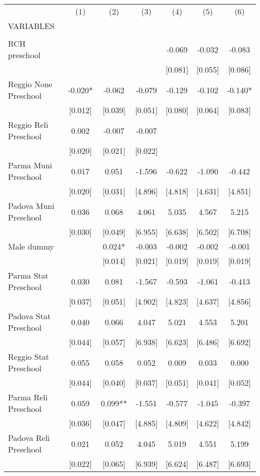 \begin{tabular}{lcccccc} \hline
 & (1) & (2) & (3) & (4) & (5) & (6) \\
VARIABLES &  &  &  &  &  &  \\ \hline
 &  &  &  &  &  &  \\
RCH preschool &  &  &  & -0.069 & -0.032 & -0.083 \\
 &  &  &  & [0.081] & [0.055] & [0.086] \\
Reggio None Preschool & -0.020* & -0.062 & -0.079 & -0.129 & -0.102 & -0.140* \\
 & [0.012] & [0.039] & [0.051] & [0.080] & [0.064] & [0.083] \\
Reggio Reli Preschool & 0.002 & -0.007 & -0.007 &  &  &  \\
 & [0.020] & [0.021] & [0.022] &  &  &  \\
Parma Muni Preschool & 0.017 & 0.051 & -1.596 & -0.622 & -1.090 & -0.442 \\
 & [0.020] & [0.031] & [4.896] & [4.818] & [4.631] & [4.851] \\
Padova Muni Preschool & 0.036 & 0.068 & 4.061 & 5.035 & 4.567 & 5.215 \\
 & [0.030] & [0.049] & [6.955] & [6.638] & [6.502] & [6.708] \\
Male dummy &  & 0.024* & -0.003 & -0.002 & -0.002 & -0.001 \\
 &  & [0.014] & [0.021] & [0.019] & [0.019] & [0.019] \\
Parma Stat Preschool & 0.030 & 0.081 & -1.567 & -0.593 & -1.061 & -0.413 \\
 & [0.037] & [0.051] & [4.902] & [4.823] & [4.637] & [4.856] \\
Padova Stat Preschool & 0.040 & 0.066 & 4.047 & 5.021 & 4.553 & 5.201 \\
 & [0.044] & [0.057] & [6.938] & [6.623] & [6.486] & [6.692] \\
Reggio Stat Preschool & 0.055 & 0.058 & 0.052 & 0.009 & 0.033 & 0.000 \\
 & [0.044] & [0.040] & [0.037] & [0.051] & [0.041] & [0.052] \\
Parma Reli Preschool & 0.059 & 0.099** & -1.551 & -0.577 & -1.045 & -0.397 \\
 & [0.036] & [0.047] & [4.885] & [4.809] & [4.622] & [4.842] \\
Padova Reli Preschool & 0.021 & 0.052 & 4.045 & 5.019 & 4.551 & 5.199 \\
 & [0.022] & [0.065] & [6.939] & [6.624] & [6.487] & [6.693] \\

\end{tabular}
